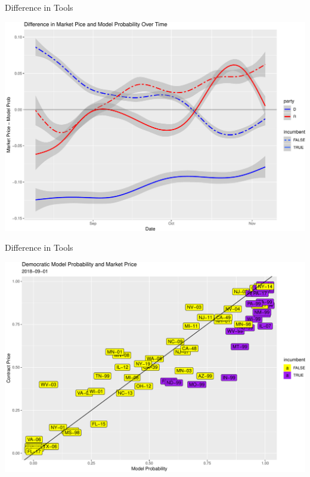 \documentclass[ignorenonframetext,]{beamer}
\begin{document}
\begin{frame}{Difference in Tools}

\includegraphics{markets_models_files/figure-beamer/diff-1.pdf}

\end{frame}

\begin{frame}{Difference in Tools}

\includegraphics{markets_models_files/figure-beamer/aug10 label-1.pdf}

\end{frame}
\end{document}
